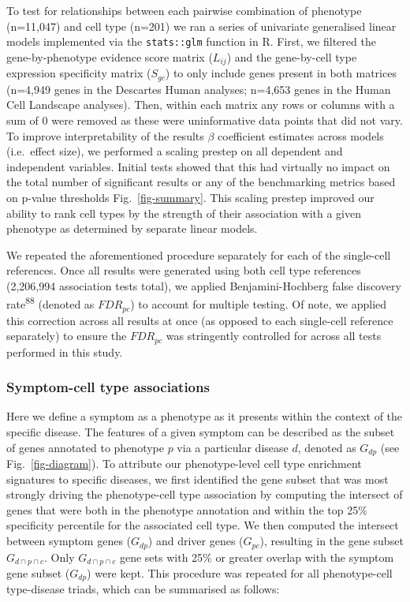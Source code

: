 \documentclass[
]{article}
\begin{document}
To test for relationships between each pairwise combination of phenotype
(n=11,047) and cell type (n=201) we ran a series of univariate
generalised linear models implemented via the \texttt{stats::glm}
function in R. First, we filtered the gene-by-phenotype evidence score
matrix (\(L_{ij}\)) and the gene-by-cell type expression specificity
matrix (\(S_{gc}\)) to only include genes present in both matrices
(n=4,949 genes in the Descartes Human analyses; n=4,653 genes in the
Human Cell Landscape analyses). Then, within each matrix any rows or
columns with a sum of 0 were removed as these were uninformative data
points that did not vary. To improve interpretability of the results
\(\beta\) coefficient estimates across models (i.e.~effect size), we
performed a scaling prestep on all dependent and independent variables.
Initial tests showed that this had virtually no impact on the total
number of significant results or any of the benchmarking metrics based
on p-value thresholds Fig.~\ref{fig-summary}. This scaling prestep
improved our ability to rank cell types by the strength of their
association with a given phenotype as determined by separate linear
models.

We repeated the aforementioned procedure separately for each of the
single-cell references. Once all results were generated using both cell
type references (2,206,994 association tests total), we applied
Benjamini-Hochberg false discovery rate\textsuperscript{88} (denoted as
\(FDR_{pc}\)) to account for multiple testing. Of note, we applied this
correction across all results at once (as opposed to each single-cell
reference separately) to ensure the \(FDR_{pc}\) was stringently
controlled for across all tests performed in this study.

\subsubsection{Symptom-cell type
associations}\label{symptom-cell-type-associations}

Here we define a symptom as a phenotype as it presents within the
context of the specific disease. The features of a given symptom can be
described as the subset of genes annotated to phenotype \(p\) via a
particular disease \(d\), denoted as \(G_{dp}\) (see
Fig.~\ref{fig-diagram}). To attribute our phenotype-level cell type
enrichment signatures to specific diseases, we first identified the gene
subset that was most strongly driving the phenotype-cell type
association by computing the intersect of genes that were both in the
phenotype annotation and within the top 25\% specificity percentile for
the associated cell type. We then computed the intersect between symptom
genes (\(G_{dp}\)) and driver genes (\(G_{pc}\)), resulting in the gene
subset \(G_{d \cap p \cap c}\). Only \(G_{d \cap p \cap c}\) gene sets
with 25\% or greater overlap with the symptom gene subset (\(G_{dp}\))
were kept. This procedure was repeated for all phenotype-cell
type-disease triads, which can be summarised as follows:
\end{document}
